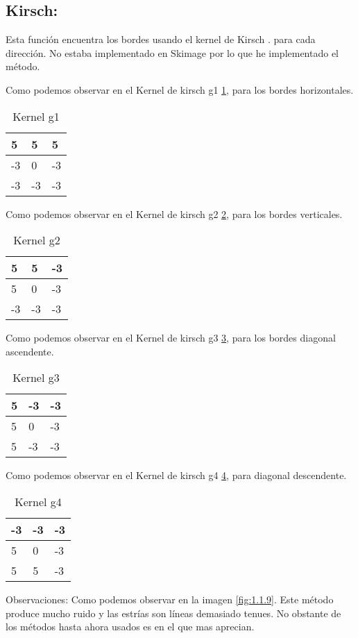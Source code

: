 \subsection{Kirsch:}
Esta función encuentra los bordes usando el kernel de Kirsch \cite{wiki:Kirsch}.
para cada dirección.
No estaba implementado en Skimage por lo que he implementado el método.

Como podemos observar en el Kernel de kirsch g1 \ref{F_k6_1}, para los bordes horizontales.
\begin{table}[]
	\centering
	\caption{Kernel g1}
	\label{F_k6_1}
	\begin{tabular}{|l|l|l|}
		\hline
		5  & 5  & 5  \\ \hline
		-3 & 0  & -3 \\ \hline
		-3 & -3 & -3 \\ \hline
	\end{tabular}
\end{table}

Como podemos observar en el Kernel de kirsch g2 \ref{F_k6_2}, para los bordes verticales.
\begin{table}[]
	\centering
	\caption{Kernel g2}
	\label{F_k6_2}
	\begin{tabular}{|l|l|l|}
		\hline
		5  & 5  & -3  \\ \hline
		5 & 0  & -3 \\ \hline
		-3 & -3 & -3 \\ \hline
	\end{tabular}
\end{table}


Como podemos observar en el Kernel de kirsch g3 \ref{F_k6_3}, para los bordes diagonal ascendente.

\begin{table}[]
	\centering
	\caption{Kernel g3}
	\label{F_k6_3}
	\begin{tabular}{|l|l|l|}
		\hline
		5  & -3 & -3  \\ \hline
		5 & 0  & -3 \\ \hline
		5 & -3 & -3 \\ \hline
	\end{tabular}
\end{table}

Como podemos observar en el Kernel de kirsch g4 \ref{F_k6_4}, para diagonal descendente.

\begin{table}[]
	\centering
	\caption{Kernel g4}
	\label{F_k6_4}
	\begin{tabular}{|l|l|l|}
		\hline
		-3  & -3 & -3  \\ \hline
		5 & 0  & -3 \\ \hline
		5 & 5 & -3 \\ \hline
	\end{tabular}
\end{table}
Observaciones:
Como podemos observar en la imagen \ref{fig:1.1.9}.
Este método produce mucho ruido y las estrías son líneas demasiado tenues.
No obstante de los métodos hasta ahora usados es en el que mas aprecian.

